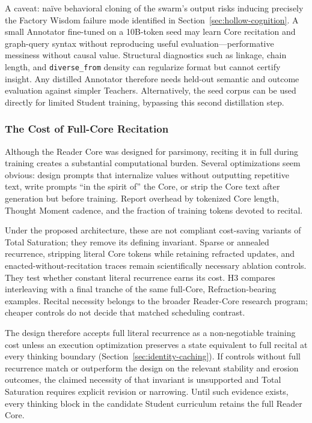 A caveat: na\"ive behavioral cloning of the swarm's output risks inducing precisely the Factory Wisdom failure mode identified in Section~\ref{sec:hollow-cognition}. A small Annotator fine-tuned on a 10B-token seed may learn Core recitation and graph-query syntax without reproducing useful evaluation---performative messiness without causal value. Structural diagnostics such as linkage, chain length, and \texttt{diverse\_from} density can regularize format but cannot certify insight. Any distilled Annotator therefore needs held-out semantic and outcome evaluation against simpler Teachers. Alternatively, the seed corpus can be used directly for limited Student training, bypassing this second distillation step.

\subsubsection{The Cost of Full-Core Recitation}

Although the Reader Core was designed for parsimony, reciting it in full during training creates a substantial computational burden. Several optimizations seem obvious: design prompts that internalize values without outputting repetitive text, write prompts ``in the spirit of'' the Core, or strip the Core text after generation but before training. Report overhead by tokenized Core length, Thought Moment cadence, and the fraction of training tokens devoted to recital.

Under the proposed architecture, these are not compliant cost-saving variants of Total Saturation; they remove its defining invariant. Sparse or annealed recurrence, stripping literal Core tokens while retaining refracted updates, and enacted-without-recitation traces remain scientifically necessary ablation controls. They test whether constant literal recurrence earns its cost. H3 compares interleaving with a final tranche of the same full-Core, Refraction-bearing examples. Recital necessity belongs to the broader Reader-Core research program; cheaper controls do not decide that matched scheduling contrast.

The design therefore accepts full literal recurrence as a non-negotiable training cost unless an execution optimization preserves a state equivalent to full recital at every thinking boundary (Section~\ref{sec:identity-caching}). If controls without full recurrence match or outperform the design on the relevant stability and erosion outcomes, the claimed necessity of that invariant is unsupported and Total Saturation requires explicit revision or narrowing. Until such evidence exists, every thinking block in the candidate Student curriculum retains the full Reader Core.

